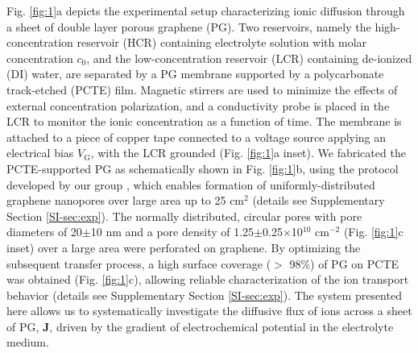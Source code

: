 \documentclass[journal=nalefd,email=true, hyperref=true, keywords=false]{achemso}
\newcommand{\Fig}{Fig.}
\begin{document}
\Fig{} \ref{fig:1}a depicts the experimental setup characterizing
ionic diffusion through a sheet of double layer porous graphene
(PG). Two reservoirs, namely the high-concentration reservoir (HCR)
containing electrolyte solution with molar concentration $c_0$, and
the low-concentration reservoir (LCR) containing de-ionized (DI)
water, are separated by a PG membrane supported by a polycarbonate
track-etched (PCTE) film. Magnetic stirrers are used to minimize the
effects of external concentration polarization, and a conductivity
probe is placed in the LCR to monitor the ionic concentration as a
function of time. The membrane is attached to a piece of copper tape
connected to a voltage source applying an electrical bias
$V_{\mathrm{G}}$, with the LCR grounded (\Fig{} \ref{fig:1}a
inset). We fabricated the PCTE-supported PG as schematically shown in
\Fig{} \ref{fig:1}b, using the protocol developed by our group
\cite{Choi_2018}, which enables formation of uniformly-distributed
graphene nanopores over large area up to 25 cm$^{2}$ (details see
Supplementary Section \ref{SI-sec:exp}). The normally distributed,
circular pores with pore diameters of 20$\pm$10 nm and a pore density
of 1.25$\pm$0.25$\times$10$^{10}$ cm$^{-2}$ (\Fig{} \ref{fig:1}c
inset) over a large area were perforated on graphene.  By optimizing
the subsequent transfer process, a high surface coverage ($>$ 98\%) of
PG on PCTE was obtained (\Fig{} \ref{fig:1}c), allowing reliable
characterization of the ion transport behavior (details see
Supplementary Section \ref{SI-sec:exp}).  The system presented here
allows us to systematically investigate the diffusive flux of ions
across a sheet of PG, $\boldsymbol{J}$, driven by the gradient of
electrochemical potential in the electrolyte medium.
\end{document}
